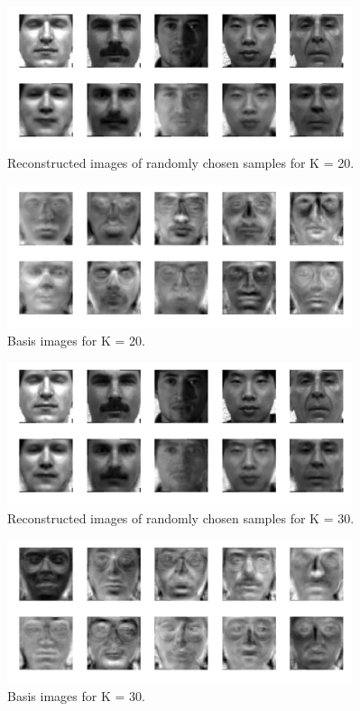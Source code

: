 \documentclass[a4paper,11pt]{article}
\begin{document}
\begin{mlsolution}
\begin{figure}[!htbp]
	\centering
	\includegraphics[width=0.9\textwidth, height=0.4\linewidth]{images/img_k_20.png}
	\caption[k = 20]{Reconstructed images of randomly chosen samples for K = 20.}
\end{figure}
\begin{figure}[!htbp]
	\centering
	\includegraphics[width=0.9\textwidth, height=0.4\linewidth]{images/template_weights_k_20.png}
	\caption[k = 20]{Basis images for K = 20.}
\end{figure}

\begin{figure}[!htbp]
	\centering
	\includegraphics[width=0.9\textwidth, height=0.4\linewidth]{images/img_k_30.png}
	\caption[k = 30]{Reconstructed images of randomly chosen samples for K = 30.}
\end{figure}
\begin{figure}[!htbp]
	\centering
	\includegraphics[width=0.9\textwidth, height=0.4\linewidth]{images/template_weights_k_30.png}
	\caption[k = 30]{Basis images for K = 30.}
\end{figure}


\end{mlsolution}
\end{document}
